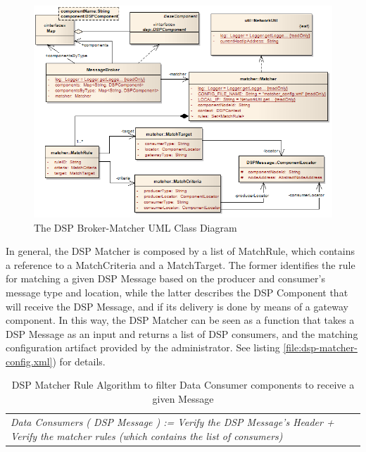 \begin{figure}[!b]
  \centering
  \includegraphics[scale=0.6]{../diagrams/DSPBroker-Matcher-Class-Diagram}
  \caption{The DSP Broker-Matcher UML Class Diagram}
  \label{fig:DSPBroker-Matcher-Class-Diagram}
\end{figure}

In general, the DSP Matcher is composed by a list of MatchRule, which contains
a reference to a MatchCriteria and a MatchTarget. The former identifies the
rule for matching a given DSP Message based on the producer and consumer's
message type and location, while the latter describes the DSP Component that
will receive the DSP Message, and if its delivery is done by means of a gateway
component. In this way, the DSP Matcher can be seen as a function that takes a
DSP Message as an input and returns a list of DSP consumers, and the
matching configuration artifact provided by the administrator. See listing
\ref{file:dsp-matcher-config.xml}) for details.

\begin{table}
    \caption{DSP Matcher Rule Algorithm to filter Data Consumer components to
    receive a given Message}
    \begin{center}
        \begin{tabular}{lr}
          \textit{Data Consumers ( DSP Message ) := Verify the DSP
          Message's Header + Verify the matcher rules (which contains the list
          of consumers)}
        \end{tabular}
    \end{center}
    \label{tab:ysi-data-stream}
\end{table}


